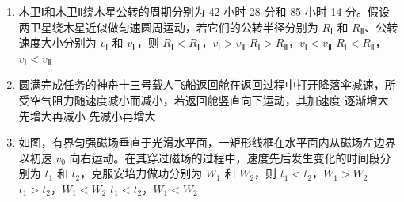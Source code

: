 \documentclass[\gkver]{gaokaozhenti}
\begin{document}
\begin{enumerate}
\item
木卫Ⅰ和木卫Ⅱ绕木星公转的周期分别为 42 小时 28 分和 85 小时 14 分。假设两卫星绕木星近似做匀速圆周运动，若它们的公转半径分别为 $R_{\text{Ⅰ}}$ 和 $R_{\text{Ⅱ}}$、公转速度大小分别为 $v_{\text{Ⅰ}}$ 和 $v_{\text{Ⅱ}}$，则
{$R_{\text{Ⅰ}} < R_{\text{Ⅱ}}$，$v_{\text{Ⅰ}} > v_{\text{Ⅱ}}$}
{$R_{\text{Ⅰ}} > R_{\text{Ⅱ}}$，$v_{\text{Ⅰ}} < v_{\text{Ⅱ}}$}
{$R_{\text{Ⅰ}} < R_{\text{Ⅱ}}$，$v_{\text{Ⅰ}} < v_{\text{Ⅱ}}$}

\item
圆满完成任务的神舟十三号载人飞船返回舱在返回过程中打开降落伞减速，所受空气阻力随速度减小而减小，若返回舱竖直向下运动，其加速度
{逐渐增大}
{先增大再减小}
{先减小再增大}

\item
如图，有界匀强磁场垂直于光滑水平面，一矩形线框在水平面内从磁场左边界以初速 $v_{0}$ 向右运动。在其穿过磁场的过程中，速度先后发生变化的时间段分别为 $t_{1}$ 和 $t_{2}$，克服安培力做功分别为 $W_{1}$ 和 $W_{2}$，则
\onepicture[w=5.5cm]{}
{$t_{1} < t_{2}$，$W_{1} > W_{2}$}
{$t_{1} > t_{2}$，$W_{1} < W_{2}$}
{$t_{1} < t_{2}$，$W_{1} < W_{2}$}
\end{enumerate}
\end{document}
